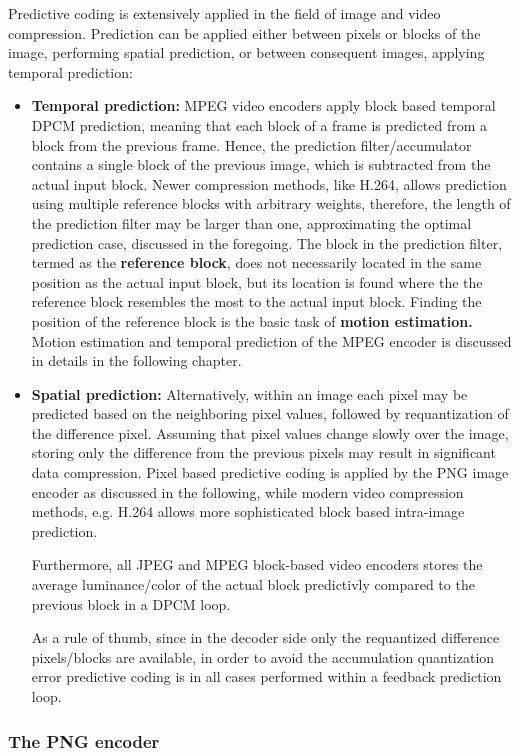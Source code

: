 Predictive coding is extensively applied in the field of image and video compression.
Prediction can be applied either between pixels or blocks of the image, performing spatial prediction, or between consequent images, applying temporal prediction:
\begin{itemize}
\item \textbf{Temporal prediction:} MPEG video encoders apply block based temporal DPCM prediction, meaning that each block of a frame is predicted from a block from the previous frame.
Hence, the prediction filter/accumulator contains a single block of the previous image, which is subtracted from the actual input block.
Newer compression methods, like H.264, allows prediction using multiple reference blocks with arbitrary weights, therefore, the length of the prediction filter may be larger than one, approximating the optimal prediction case, discussed in the foregoing.
The block in the prediction filter, termed as the \textbf{reference block}, does not necessarily located in the same position as the actual input block, but its location is found where the the reference block resembles the most to the actual input block.
Finding the position of the reference block is the basic task of \textbf{motion estimation.}
Motion estimation and temporal prediction of the MPEG encoder is discussed in details in the following chapter.
%
\item \textbf{Spatial prediction:} Alternatively, within an image each pixel may be predicted based on the neighboring pixel values, followed by requantization of the difference pixel.
Assuming that pixel values change slowly over the image, storing only the difference from the previous pixels may result in significant data compression.
Pixel based predictive coding is applied by the PNG image encoder as discussed in the following, while modern video compression methods, e.g. H.264 allows more sophisticated block based intra-image prediction.

Furthermore, all JPEG and MPEG block-based video encoders stores the average luminance/color of the actual block predictivly compared to the previous block in a DPCM loop.

As a rule of thumb, since in the decoder side only the requantized difference pixels/blocks are available, in order to avoid the accumulation quantization error predictive coding is in all cases performed within a feedback prediction loop.
\end{itemize}

\subsubsection{The PNG encoder}

